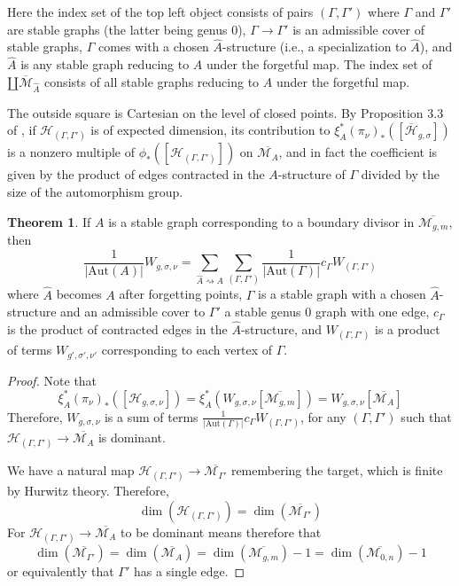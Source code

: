 \documentclass[thesis]{thesis-umich}           %
\newcommand{\Aut}{\text{Aut}}
\newcommand{\Hb}{\overline{\mathcal H}}
\theoremstyle{definition}
\newtheorem{thm}{Theorem}[section]
\begin{document}
Here the index set of the top left object
consists of pairs $(\Gamma,\Gamma')$
where $\Gamma$ and $\Gamma'$ are stable graphs (the latter being genus $0$), $\Gamma\to\Gamma'$ is an admissible cover of stable graphs, $\Gamma$
comes with a chosen $\hat A$-structure (i.e., a specialization to $\hat A$),
and $\hat A$ is any stable graph reducing to $A$ under the forgetful map.
The index set of $\amalg\overline{\mathcal M}_{\hat A}$ consists of
all stable graphs reducing to $A$ under the forgetful map.

The outside square is Cartesian on the level of closed points. By
Proposition 3.3 of \cite{Lian}, if $\mathcal H_{(\Gamma,\Gamma')}$ is of
expected dimension, its contribution to $\xi_A^*(\pi_{\nu})_*([\Hb_{g,\sigma}])$
is a nonzero multiple of $\phi_*([\mathcal H_{(\Gamma,\Gamma')}])$ on $\overline{\mathcal M_A}$, and in fact the coefficient is given by the product of edges contracted in the $A$-structure of $\Gamma$ divided by the size of the automorphism group.%

\begin{thm}
  \label{thm:admissible}
  If $A$ is a stable graph corresponding to a boundary divisor in $\overline{\mathcal M_{g,m}}$, then
  \[
  \frac 1{|\Aut(A)|}W_{g,\sigma,\nu}=\sum_{\hat A\rightsquigarrow A}\sum_{(\Gamma,\Gamma')}\frac 1{|\Aut(\Gamma)|}c_{\Gamma}W_{(\Gamma,\Gamma')}
  \]
  where $\hat A$ becomes $A$ after forgetting points, $\Gamma$ is a stable graph with a chosen $\hat A$-structure and an admissible
  cover to $\Gamma'$ a stable genus $0$ graph with one edge, $c_{\Gamma}$ is the
  product of contracted edges in the $\hat A$-structure, and
  $W_{(\Gamma,\Gamma')}$ is a product of terms $W_{g',\sigma',\nu'}$ corresponding to each vertex of $\Gamma$.
\end{thm}

\begin{proof}
  Note that
  \[
  \xi_A^*(\pi_{\nu})_*([\mathcal H_{g,\sigma,\nu}]) =
  \xi_A^*(W_{g,\sigma,\nu}[\overline{\mathcal M_{g,m}}])=
  W_{g,\sigma,\nu}[\overline{\mathcal M_A}]
  \]
  Therefore, $W_{g,\sigma,\nu}$ is a sum of
  terms $\frac 1{|\Aut(\Gamma)|}c_{\Gamma}W_{(\Gamma,\Gamma')}$, for
  any $(\Gamma,\Gamma')$ such that
  $\mathcal H_{(\Gamma,\Gamma')}\to\overline{\mathcal M_A}$
  is dominant.

  We have a natural map $\mathcal H_{(\Gamma,\Gamma')}\to \overline{\mathcal M_{\Gamma'}}$ remembering the target, which is finite by Hurwitz theory. Therefore,
  \[
  \dim(\mathcal H_{(\Gamma,\Gamma')})=\dim(\overline{\mathcal M_{\Gamma'}})
  \]
  For $\mathcal H_{(\Gamma,\Gamma')}\to\overline{\mathcal M_A}$ to be
  dominant means therefore that
  \[
  \dim(\overline{\mathcal M_{\Gamma'}})=\dim(\overline{\mathcal M_A})=
  \dim(\overline{\mathcal M_{g,m}})-1=\dim(\overline{\mathcal M_{0,n}})-1
  \]
  or equivalently that $\Gamma'$ has a single edge.
\end{proof}
\end{document}
